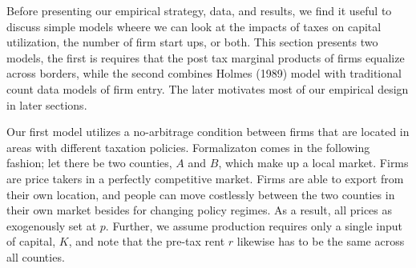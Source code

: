 \documentclass{article}
\begin{document}
Before presenting our empirical strategy, data, and results, we find it useful to discuss simple models wheere we can look at the impacts of taxes on capital utilization, the number of firm start ups, or both. This section presents two models, the first is requires that the post tax marginal products of firms equalize across borders, while the second combines Holmes (1989) model with traditional count data models of firm entry. The later motivates most of our empirical design in later sections.

Our first model utilizes a no-arbitrage condition between firms that are located in areas with different taxation policies. Formalizaton comes in the following fashion; let there be two counties, $A$ and $B$, which make up a local market. Firms are price takers in a perfectly competitive market. Firms are able to export from their own location, and people can move costlessly between the two counties in their own market besides for changing policy regimes. As a result, all prices as exogenously set at $p$. Further, we assume production requires only a single input of capital, $K$, and note that the pre-tax rent $r$ likewise has to be the same across all counties.
\end{document}
